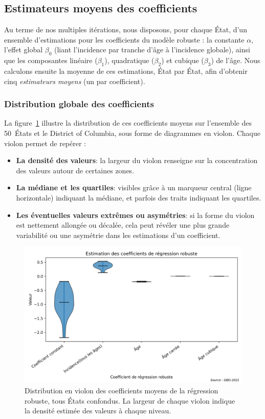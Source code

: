 \subsection{Estimateurs moyens des coefficients}

Au terme de nos multiples itérations, nous disposons, pour chaque État, d'un ensemble d'estimations pour les coefficients du modèle robuste : la constante \(\alpha\), l'effet global \(\beta_0\) (liant l'incidence par tranche d'âge à l'incidence globale), ainsi que les composantes linéaire (\(\beta_1\)), quadratique (\(\beta_2\)) et cubique (\(\beta_3\)) de l'âge. Nous calculons ensuite la moyenne de ces estimations, État par État, afin d'obtenir cinq \emph{estimateurs moyens} (un par coefficient).

\subsubsection*{Distribution globale des coefficients}
La figure~\ref{fig:violin-coeffs} illustre la distribution de ces coefficients moyens sur l'ensemble des 50~États et le District of Columbia, sous forme de diagrammes en violon. Chaque violon permet de repérer :
\begin{itemize}
	\item \textbf{La densité des valeurs}: la largeur du violon renseigne sur la concentration des valeurs autour de certaines zones.
	\item \textbf{La médiane et les quartiles}: visibles grâce à un marqueur central (ligne horizontale) indiquant la médiane, et parfois des traits indiquant les quartiles.
	\item \textbf{Les éventuelles valeurs extrêmes ou asymétries}: si la forme du violon est nettement allongée ou décalée, cela peut révéler une plus grande variabilité ou une asymétrie dans les estimations d'un coefficient.
\end{itemize}

\begin{figure}[H]
	\centering
	\includegraphics[width=1\textwidth]{images/violin_coefficients.png}
	\caption{Distribution en violon des coefficients moyens de la régression robuste, tous États confondus. 
		La largeur de chaque violon indique la densité estimée des valeurs à chaque niveau.}
	\label{fig:violin-coeffs}
\end{figure}

